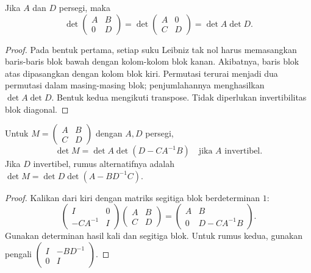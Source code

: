 \begin{prop}
      Jika $A$ dan $D$ persegi, maka
      \[
            \det\begin{pmatrix}A&B\\0&D\end{pmatrix}
            =\det\begin{pmatrix}A&0\\C&D\end{pmatrix}
            =\det A\det D.
      \]
\end{prop}
\begin{proof}
      Pada bentuk pertama, setiap suku Leibniz tak nol harus memasangkan
      baris-baris blok bawah dengan kolom-kolom blok kanan.
      Akibatnya, baris blok atas dipasangkan dengan kolom blok kiri.
      Permutasi terurai menjadi dua permutasi dalam masing-masing blok;
      penjumlahannya menghasilkan $\det A\det D$. Bentuk kedua mengikuti
      transpose. Tidak diperlukan invertibilitas blok diagonal.
\end{proof}

\begin{thm}
      \label{det:schur}
      Untuk $M=\begin{pmatrix}A&B\\C&D\end{pmatrix}$ dengan $A,D$ persegi,
      \[
            \det M=\det A\det(D-CA^{-1}B)\quad\text{jika }A\text{ invertibel}.
      \]
      Jika $D$ invertibel, rumus alternatifnya adalah
      $\det M=\det D\det(A-BD^{-1}C)$.
\end{thm}
\begin{proof}
      Kalikan dari kiri dengan matriks segitiga blok berdeterminan $1$:
      \[
            \begin{pmatrix}I&0\\-CA^{-1}&I\end{pmatrix}
            \begin{pmatrix}A&B\\C&D\end{pmatrix}
            =\begin{pmatrix}A&B\\0&D-CA^{-1}B\end{pmatrix}.
      \]
      Gunakan determinan hasil kali dan segitiga blok.
      Untuk rumus kedua, gunakan pengali
      $\left(\begin{smallmatrix}I&-BD^{-1}\\0&I\end{smallmatrix}\right)$.
\end{proof}

